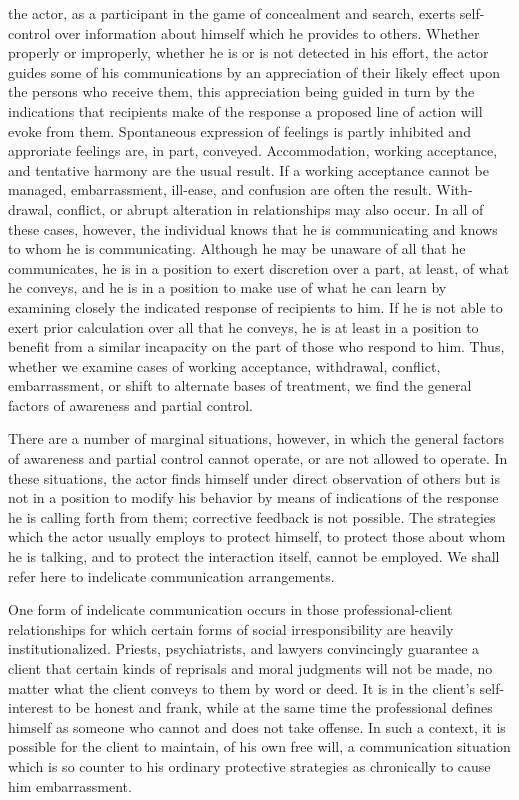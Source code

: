 \documentclass[twoside,symmetric,nobib,justified]{tufte-book}
\begin{document}
 the actor, as a participant in the game of
concealment and search, exerts self-control over in­formation about
himself which he provides to others. Whether properly or improperly,
whether he is or is not detected in his effort, the actor guides some of
his communications by an appre­ciation of their likely effect upon the
persons who receive them, this appreciation being guided in turn by the
indications that recipients make of the response a proposed line of
action will evoke from them. Spontaneous expression of feelings is
partly inhibited and approriate feelings are, in part, conveyed.
Ac­commodation, working acceptance, and tentative harmony are the usual
result. If a working acceptance cannot be managed, embarrassment,
ill-ease, and confusion are often the result. With­drawal, conflict, or
abrupt alteration in relationships may also occur. In all of these
cases, however, the individual knows that he is communicating and knows
to whom he is communicating. Although he may be unaware of all that he
communicates, he is in a position to exert discretion over a part, at
least, of what he conveys, and he is in a position to make use of what
he can learn by examining closely the indicated response of recipients
to him. If he is not able to exert prior calculation over all that he
conveys, he is at least in a position to benefit from a similar
incapacity on the part of those who respond to him. Thus, whether we
examine cases of working acceptance, withdrawal, con­flict,
embarrassment, or shift to alternate bases of treatment, we find the
general factors of awareness and partial control.

There are a number of marginal situations, however, in which the general
factors of awareness and partial control can­not operate, or are not
allowed to operate. In these situations, the actor finds himself under
direct observation of others but is not in a position to modify his
behavior by means of indica­tions of the response he is calling forth
from them; corrective feedback is not possible. The strategies which the
actor usually employs to protect himself, to protect those about whom he
is talking, and to protect the interaction itself, cannot be employed.
We shall refer here to indelicate communication arrangements.

One form of indelicate communication occurs in those ­professional-client
relationships for which certain forms of social irresponsibility are
heavily institutionalized. Priests, psychiatrists, and lawyers
convincingly guarantee a client that certain kinds of reprisals and
moral judgments will not be made, no matter what the client conveys to
them by word or deed. It is in the client's self-interest to be honest
and frank, while at the same time the professional defines himself as
someone who cannot and does not take offense. In such a context, it is
pos­sible for the client to maintain, of his own free will, a
com­munication situation which is so counter to his ordinary protective
strategies as chronically to cause him embarrassment.
\end{document}
